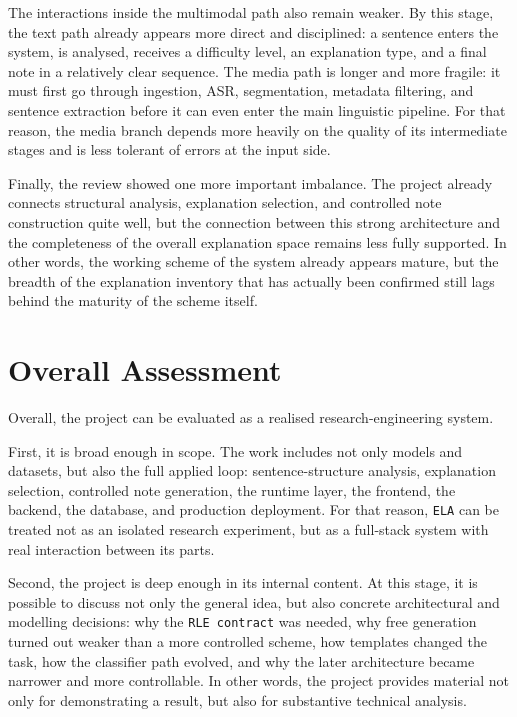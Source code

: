 \documentclass[12pt,a4paper,oneside]{report}
\begin{document}
The interactions inside the multimodal path also remain weaker. By this stage, the text path already appears more direct and disciplined: a sentence enters the system, is analysed, receives a difficulty level, an explanation type, and a final note in a relatively clear sequence. The media path is longer and more fragile: it must first go through ingestion, ASR, segmentation, metadata filtering, and sentence extraction before it can even enter the main linguistic pipeline. For that reason, the media branch depends more heavily on the quality of its intermediate stages and is less tolerant of errors at the input side.

Finally, the review showed one more important imbalance. The project already connects structural analysis, explanation selection, and controlled note construction quite well, but the connection between this strong architecture and the completeness of the overall explanation space remains less fully supported. In other words, the working scheme of the system already appears mature, but the breadth of the explanation inventory that has actually been confirmed still lags behind the maturity of the scheme itself.

\section{Overall Assessment}
Overall, the project can be evaluated as a realised research-engineering system.

First, it is broad enough in scope. The work includes not only models and datasets, but also the full applied loop: sentence-structure analysis, explanation selection, controlled note generation, the runtime layer, the frontend, the backend, the database, and production deployment. For that reason, \texttt{ELA} can be treated not as an isolated research experiment, but as a full-stack system with real interaction between its parts.

Second, the project is deep enough in its internal content. At this stage, it is possible to discuss not only the general idea, but also concrete architectural and modelling decisions: why the \texttt{RLE contract} was needed, why free generation turned out weaker than a more controlled scheme, how templates changed the task, how the classifier path evolved, and why the later architecture became narrower and more controllable. In other words, the project provides material not only for demonstrating a result, but also for substantive technical analysis.
\end{document}

